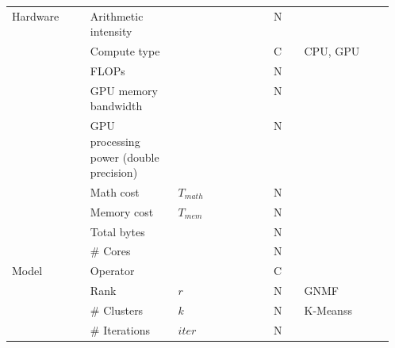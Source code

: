 \begin{tabular}{lp{0.23\linewidth}p{0.10\linewidth}>{\footnotesize}p{0.15\linewidth}p{0.08\linewidth}l}
    \multirow[t]{9}{*}{Hardware} & Arithmetic intensity                    &              &                                     & N    &                        \\
                                 & Compute type                            &              &                                     & C    & CPU, GPU               \\
                                 & FLOPs                                   &              &                                     & N    &                        \\
                                 & GPU memory bandwidth                    &              &                                     & N    &                        \\
                                 & GPU processing power (double precision) &              &                                     & N    &                        \\
                                 & Math cost                               & $T_{math}$   &                                     & N    &                        \\
                                 & Memory cost                             & $T_{mem}$    &                                     & N    &                        \\
                                 & Total bytes                             &              &                                     & N    &                        \\
                                 & \# Cores                                &              &                                     & N    &                        \\

    \multirow[t]{4}{*}{Model}    & Operator                                &              &                                     & C    &                        \\
                                 & Rank                                    & $r$          &                                     & N    & GNMF                   \\
                                 & \# Clusters                             & $k$          &                                     & N    & K-Meanss               \\
                                 & \# Iterations                           & $iter$       &                                     & N    &                        \\

    \bottomrule
\end{tabular}
